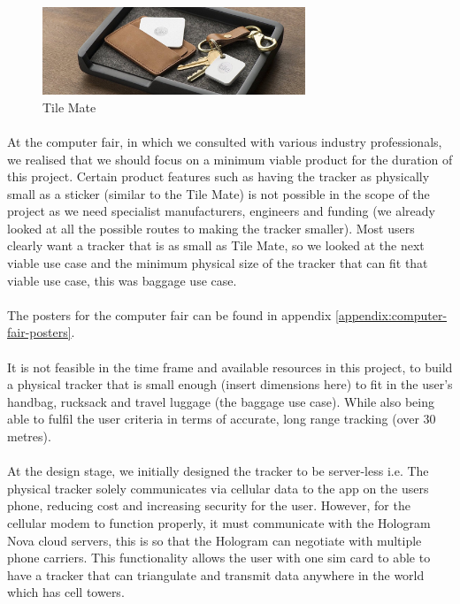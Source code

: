 \documentclass[12pt,a4paper]{article}
\begin{document}
        \begin{figure}[H]
          \centering
          \includegraphics[width=0.7\textwidth]{../assets/design-concept-tile-mate.jpg}
          \caption{Tile Mate}
          \label{fig:Tile Mate}
        \end{figure}
        
        \paragraph{} At the computer fair, in which we consulted with various industry professionals, we realised that we should focus on a minimum viable product for the duration of this project. Certain product features such as having the tracker as physically small as a sticker (similar to the Tile Mate) is not possible in the scope of the project as we need specialist manufacturers, engineers and funding (we already looked at all the possible routes to making the tracker smaller). Most users clearly want a tracker that is as small as Tile Mate, so we looked at the next viable use case and the minimum physical size of the tracker that can fit that viable use case, this was baggage use case. 

        \paragraph{} The posters for the computer fair can be found in appendix \ref{appendix:computer-fair-posters}. 
        
        \paragraph{} It is not feasible in the time frame and available resources in this project, to build a physical tracker that is small enough (insert dimensions here) to fit in the user’s handbag, rucksack and travel luggage (the baggage use case). While also being able to fulfil the user criteria in terms of accurate, long range tracking (over 30 metres).
        
        \paragraph{} At the design stage, we initially designed the tracker to be server-less i.e. The physical tracker solely communicates via cellular data to the app on the users phone, reducing cost and increasing security for the user. However, for the cellular modem to function properly, it must communicate with the Hologram Nova cloud servers, this is so that the Hologram can negotiate with multiple phone carriers. This functionality allows the user with one sim card to able to have a tracker that can triangulate and transmit data anywhere in the world which has cell towers.
        
\end{document}

